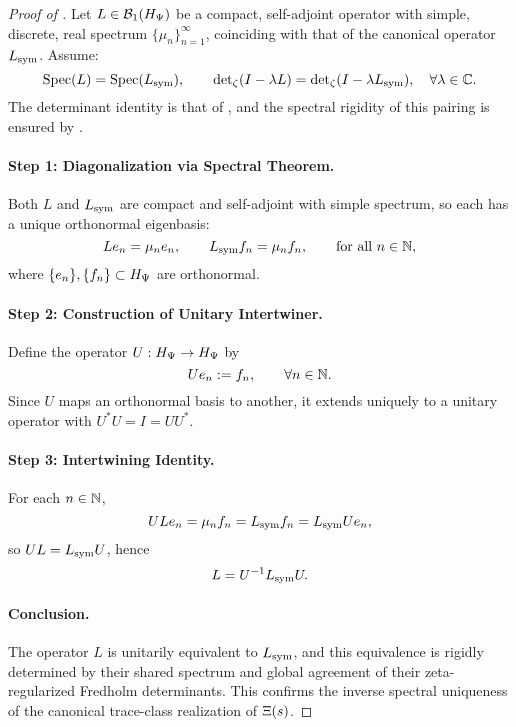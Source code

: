 \begin{proof}[Proof of ]
Let \( L \in \mathcal{B}_1(H_{\Psi}) \) be a compact, self-adjoint operator with simple, discrete, real spectrum \( \{ \mu_n \}_{n=1}^\infty \), coinciding with that of the canonical operator \( L_{\mathrm{sym}} \). Assume:
\[
\operatorname{Spec}(L) = \operatorname{Spec}(L_{\mathrm{sym}}), \qquad
\det\nolimits_\zeta(I - \lambda L) = \det\nolimits_\zeta(I - \lambda L_{\mathrm{sym}}), \quad \forall \lambda \in \mathbb{C}.
\]
The determinant identity is that of , and the spectral rigidity of this pairing is ensured by .

\paragraph{Step 1: Diagonalization via Spectral Theorem.}
Both \( L \) and \( L_{\mathrm{sym}} \) are compact and self-adjoint with simple spectrum, so each has a unique orthonormal eigenbasis:
\[
L e_n = \mu_n e_n, \qquad L_{\mathrm{sym}} f_n = \mu_n f_n, \qquad \text{for all } n \in \mathbb{N},
\]
where \( \{e_n\}, \{f_n\} \subset H_{\Psi} \) are orthonormal.

\paragraph{Step 2: Construction of Unitary Intertwiner.}
Define the operator \( U : H_{\Psi} \to H_{\Psi} \) by
\[
U e_n := f_n, \qquad \forall n \in \mathbb{N}.
\]
Since \( U \) maps an orthonormal basis to another, it extends uniquely to a unitary operator with \( U^* U = I = UU^* \).

\paragraph{Step 3: Intertwining Identity.}
For each \( n \in \mathbb{N} \),
\[
U L e_n = \mu_n f_n = L_{\mathrm{sym}} f_n = L_{\mathrm{sym}} U e_n,
\]
so \( U L = L_{\mathrm{sym}} U \), hence
\[
L = U^{-1} L_{\mathrm{sym}} U.
\]

\paragraph{Conclusion.}
The operator \( L \) is unitarily equivalent to \( L_{\mathrm{sym}} \), and this equivalence is rigidly determined by their shared spectrum and global agreement of their zeta-regularized Fredholm determinants. This confirms the inverse spectral uniqueness of the canonical trace-class realization of \( \Xi(s) \).
\end{proof}

